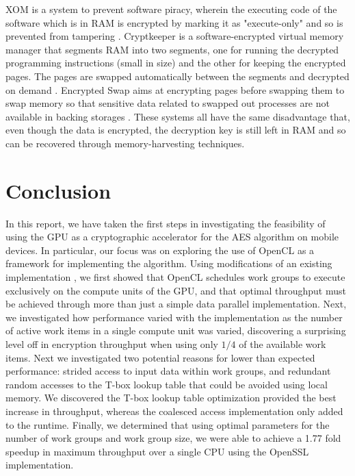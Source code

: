 \documentclass[conference,10pt]{IEEEtran}
\begin{document}
XOM is a system to prevent software piracy, wherein the executing code of the software which is in RAM is 
encrypted by marking it as "execute-only" and so is prevented from tampering \cite{xom}.  Cryptkeeper is a 
software-encrypted virtual memory manager that segments RAM into two segments, one for running the 
decrypted programming instructions (small in size) and the other for keeping the encrypted pages. The pages 
are swapped automatically between the segments and decrypted on demand \cite{cryptkeeper}.  Encrypted Swap 
aims at encrypting pages before swapping them to swap memory so that sensitive data related to swapped out 
processes are not available in backing storages \cite{encryptedswap}. These systems all have the same 
disadvantage that, even though the data is encrypted, the decryption key is still left in RAM and so can be 
recovered through memory-harvesting techniques.

\section{Conclusion}

In this report, we have taken the first steps in investigating the feasibility of using the GPU as a 
cryptographic accelerator for the AES algorithm on mobile devices.  In particular, our focus was on 
exploring the use of OpenCL as a framework for implementing the algorithm.  Using modifications of an 
existing implementation \cite{opencl_impl}, we first showed that OpenCL schedules work groups to execute 
exclusively on the compute units of the GPU, and that optimal throughput must be achieved through more than 
just a simple data parallel implementation. Next, we investigated how performance varied with the 
implementation as the number of active work items in a single compute unit was varied, discovering a 
surprising level off in encryption throughput when using only $1/4$ of the available work items.  Next we 
investigated two potential reasons for lower than expected performance: strided access to input data within 
work groups, and redundant random accesses to the T-box lookup table that could be avoided using local memory.  
We discovered the T-box lookup table optimization provided the best increase in throughput, whereas the 
coalesced access implementation only added to the runtime.  Finally, we determined that using optimal 
parameters for the number of work groups and work group size, we were able to achieve a 1.77 fold speedup in 
maximum throughput over a single CPU using the OpenSSL implementation. 
\end{document}
